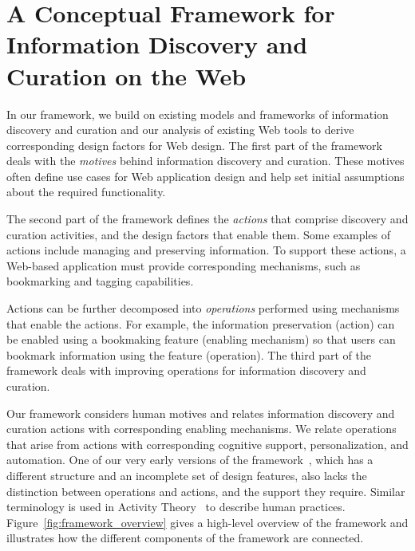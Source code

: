 \documentclass{sigchi}
\begin{document}
{\section{A Conceptual Framework for Information Discovery and Curation on the Web}
\label{sec:framework}

In our framework, we build on existing models and frameworks of information discovery and curation and our analysis of existing Web tools to derive corresponding design factors for Web design. The first part of the framework deals with the \textit{motives} behind information discovery and curation. These motives often define use cases for Web application design and help set initial assumptions about the required functionality.

The second part of the framework defines the \textit{actions} that comprise discovery and curation activities, and the design factors that enable them. Some examples of actions include managing and preserving information. To support these actions, a Web-based application must provide corresponding mechanisms, such as bookmarking and tagging capabilities.

Actions can be further decomposed into \textit{operations} performed using mechanisms that enable the actions. For example, the information preservation (action) can be enabled using a bookmaking feature (enabling mechanism) so that users can bookmark information using the feature (operation). The third part of the framework deals with improving operations for information discovery and curation.  

Our framework considers human motives and relates information discovery and curation actions with corresponding enabling mechanisms. We relate operations that arise from actions with corresponding cognitive support, personalization, and automation. One of our very early versions of the framework~\cite{voyloshnikova2014}, which has a different structure and an incomplete set of design features, also lacks the distinction between operations and actions, and the support they require. Similar terminology is used in Activity Theory~\cite{kuutti1996activity} to describe human practices. Figure~\ref{fig:framework_overview} gives a high-level overview of the framework and illustrates how the different components of the framework are connected.


}
\end{document}
